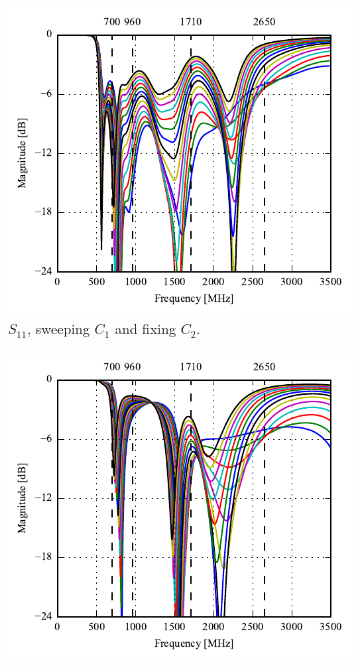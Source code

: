 \begin{figure}[htbp]
   \begin{subfigure}[b]{0.49\linewidth}
        \centering
        \includegraphics{img/tech_sol/trianglefeed/data_mode/Csh1s11.pdf}
        \caption{$S_{11}$, sweeping $C_1$ and fixing $C_2$.}
    \end{subfigure}
    \hfill
    \begin{subfigure}[b]{0.49\linewidth}
        \centering
        \includegraphics{img/tech_sol/trianglefeed/data_mode/Csh2s22.pdf}

\end{subfigure}
\end{figure}

